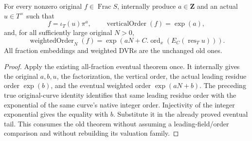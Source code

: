 \begin{theorem}
\label{thm:central-curve-original-eventual-order}
\leanok
For every nonzero original \(f\in\operatorname{Frac}S\), internally produce
\(a\in\mathbf Z\) and an actual \(u\in T^\times\) such that
\[
 f=\iota_T(u)\pi^a,\qquad \operatorname{verticalOrder}(f)=\exp(a),
\]
and, for all sufficiently large original \(N>0\),
\[
 \operatorname{weightedOrder}_N(f)
 =\exp\!\left(aN+C.\operatorname{ord}_x(E_C(\operatorname{res}_T u))\right).
\]
All fraction embeddings and weighted DVRs are the unchanged old ones.
\end{theorem}
\begin{proof}
Apply the existing all-fraction eventual theorem once. It internally gives
the original \(a,b,u\), the factorization, the vertical order, the actual
leading residue order \(\exp(b)\), and the eventual weighted order
\(\exp(aN+b)\). The preceding true original-curve identity identifies that
same leading residue order with the exponential of the same curve's native
integer order. Injectivity of the integer exponential gives the equality
with \(b\). Substitute it in the already proved eventual tail.
This consumes the old theorem without assuming a leading-field/order
comparison and without rebuilding its valuation family.
\end{proof}

